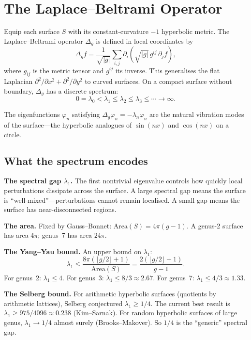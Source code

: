 \documentclass[11pt,a4paper]{article}
\begin{document}
\section{The Laplace--Beltrami Operator}

Equip each surface $S$ with its constant-curvature $-1$ hyperbolic metric. The
Laplace--Beltrami operator $\Delta_g$ is defined in local coordinates by
\[
  \Delta_g f = \frac{1}{\sqrt{|g|}} \sum_{i,j}
    \partial_i \left( \sqrt{|g|}\, g^{ij}\, \partial_j f \right),
\]
where $g_{ij}$ is the metric tensor and $g^{ij}$ its inverse. This generalises
the flat Laplacian $\partial^2/\partial x^2 + \partial^2/\partial y^2$ to
curved surfaces. On a compact surface without boundary, $\Delta_g$ has a
discrete spectrum:
\[
  0 = \lambda_0 < \lambda_1 \leq \lambda_2 \leq \lambda_3 \leq \cdots \to \infty.
\]

The eigenfunctions $\varphi_n$ satisfying $\Delta_g \varphi_n = -\lambda_n \varphi_n$
are the natural vibration modes of the surface---the hyperbolic analogues of
$\sin(nx)$ and $\cos(nx)$ on a circle.

\subsection{What the spectrum encodes}

\textbf{The spectral gap $\lambda_1$.} The first nontrivial eigenvalue controls
how quickly local perturbations dissipate across the surface. A large spectral
gap means the surface is ``well-mixed''---perturbations cannot remain localised.
A small gap means the surface has near-disconnected regions.

\textbf{The area.} Fixed by Gauss--Bonnet: $\mathrm{Area}(S) = 4\pi(g-1)$.
A genus-2 surface has area $4\pi$; genus~7 has area $24\pi$.

\textbf{The Yang--Yau bound.} An upper bound on $\lambda_1$:
\[
  \lambda_1 \leq \frac{8\pi(\lfloor g/2 \rfloor + 1)}{\mathrm{Area}(S)}
  = \frac{2(\lfloor g/2 \rfloor + 1)}{g - 1}.
\]
For genus~2: $\lambda_1 \leq 4$. For genus~3: $\lambda_1 \leq 8/3 \approx 2.67$.
For genus~7: $\lambda_1 \leq 4/3 \approx 1.33$.

\textbf{The Selberg bound.} For arithmetic hyperbolic surfaces (quotients by
arithmetic lattices), Selberg conjectured $\lambda_1 \geq 1/4$. The current best
result is $\lambda_1 \geq 975/4096 \approx 0.238$ (Kim--Sarnak). For random
hyperbolic surfaces of large genus, $\lambda_1 \to 1/4$ almost surely
(Brooks--Makover). So $1/4$ is the ``generic'' spectral gap.
\end{document}

